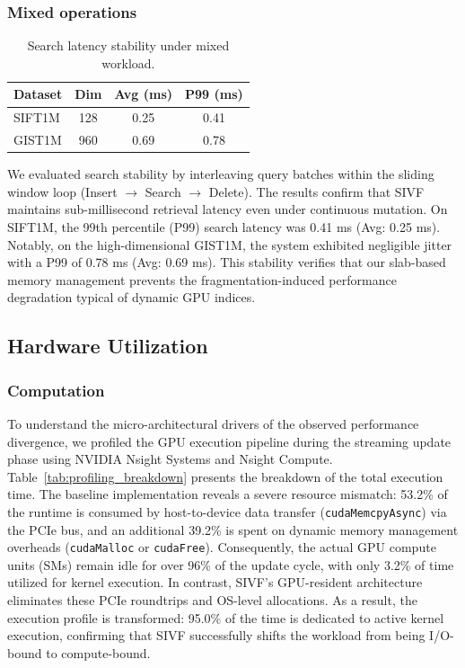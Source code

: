 \documentclass[sigconf,nonacm]{acmart}
\theoremstyle{plain}
\theoremstyle{definition}
\theoremstyle{remark}
\begin{document}
\subsubsection{Mixed operations}

\begin{table}[t]
\centering
\small
\caption{Search latency stability under mixed workload.}
\label{tab:search_stability}
\begin{tabular}{l|c|cc}
\toprule
Dataset & Dim & Avg (ms) & P99 (ms) \\
\midrule
SIFT1M  & 128 & 0.25 & 0.41 \\
GIST1M  & 960 & 0.69 & 0.78 \\
\bottomrule
\end{tabular}
\end{table}

We evaluated search stability by interleaving query batches within the sliding window loop (Insert $\rightarrow$ Search $\rightarrow$ Delete). 
The results confirm that SIVF maintains sub-millisecond retrieval latency even under continuous mutation. 
On SIFT1M, the 99th percentile (P99) search latency was 0.41 ms (Avg: 0.25 ms). 
Notably, on the high-dimensional GIST1M, the system exhibited negligible jitter with a P99 of 0.78 ms (Avg: 0.69 ms). 
This stability verifies that our slab-based memory management prevents the fragmentation-induced performance degradation typical of dynamic GPU indices.

\subsection{Hardware Utilization}
\label{sec:hardware_analysis}

\subsubsection{Computation}

To understand the micro-architectural drivers of the observed performance divergence, we profiled the GPU execution pipeline during the streaming update phase using NVIDIA Nsight Systems and Nsight Compute.
Table~\ref{tab:profiling_breakdown} presents the breakdown of the total execution time.
The baseline implementation reveals a severe resource mismatch: 53.2\% of the runtime is consumed by host-to-device data transfer (\texttt{cudaMemcpyAsync}) via the PCIe bus, and an additional 39.2\% is spent on dynamic memory management overheads (\texttt{cudaMalloc} or \texttt{cudaFree}).
Consequently, the actual GPU compute units (SMs) remain idle for over 96\% of the update cycle, with only 3.2\% of time utilized for kernel execution.
In contrast, SIVF's GPU-resident architecture eliminates these PCIe roundtrips and OS-level allocations.
As a result, the execution profile is transformed: 95.0\% of the time is dedicated to active kernel execution, confirming that SIVF successfully shifts the workload from being I/O-bound to compute-bound.
\end{document}
